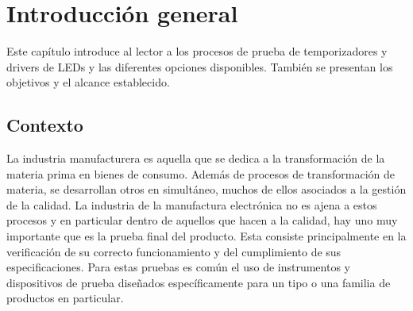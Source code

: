 
\chapter{Introducción general} %

\label{Chapter1} %


Este capítulo introduce al lector a los procesos de prueba de temporizadores y drivers de LEDs y las diferentes opciones disponibles. También se presentan los objetivos y el alcance establecido. 

\label{IntroGeneral}


\newcommand{\keyword}[1]{\textbf{#1}}
\newcommand{\tabhead}[1]{\textbf{#1}}
\newcommand{\code}[1]{\texttt{#1}}
\newcommand{\file}[1]{\texttt{\bfseries#1}}
\newcommand{\option}[1]{\texttt{\itshape#1}}
\newcommand{\grados}{$^{\circ}$}



\section{Contexto}

La industria manufacturera es aquella que se dedica a la transformación de la materia prima en bienes de consumo. Además de procesos de transformación de materia, se desarrollan otros en simultáneo, muchos de ellos asociados a la gestión de la calidad. La industria de la manufactura electrónica no es ajena a estos procesos y en particular dentro de aquellos que hacen a la calidad, hay uno muy importante que es la prueba final del producto. Esta consiste principalmente en la verificación de su correcto funcionamiento y del cumplimiento de sus especificaciones. Para estas pruebas es común el uso de instrumentos y dispositivos de prueba diseñados específicamente para un tipo o una familia de productos en particular.

